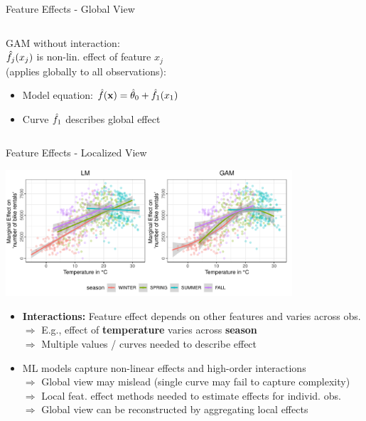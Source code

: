 \documentclass[10pt,compress,t,notes=noshow, xcolor=table]{beamer}
\begin{document}
\begin{frame}{Feature Effects - Global View}
\begin{columns}[T, totalwidth=\textwidth]
\begin{column}{0.51\linewidth}
\bigskip
GAM without interaction:\\ $\hat{f}_j(x_j)$ is non-lin. effect of feature $x_j$\\  (applies globally to all observations):
\begin{itemize}
    \item Model equation: $\hat{f}(\mathbf{x}) = \hat\theta_0 + \hat{f}_1(x_1)$
    \item Curve $\hat{f}_1$ describes global effect
\end{itemize}
\end{column}
\end{columns}

\end{frame}


\begin{frame}{Feature Effects - Localized View}

\centerline{\includegraphics[width=0.8\textwidth, trim=0cm 0.1cm 0cm 0cm, clip]{figure/lm_main_interactions}}

\begin{itemize}
    \item \textbf{Interactions:} Feature effect depends on other features and varies across obs. \\ 
    $\Rightarrow$ E.g., effect of \textbf{temperature} varies across \textbf{season}\\
    $\Rightarrow$ Multiple values / curves needed to describe effect
    \item ML models capture non-linear effects and high-order interactions \\
    $\Rightarrow$ Global view may mislead (single curve may fail to capture complexity)\\
    $\Rightarrow$ Local feat. effect methods needed to estimate effects for individ. obs.\\
    $\Rightarrow$ Global view can be reconstructed by aggregating local effects
\end{itemize}

\end{frame}
\end{document}
